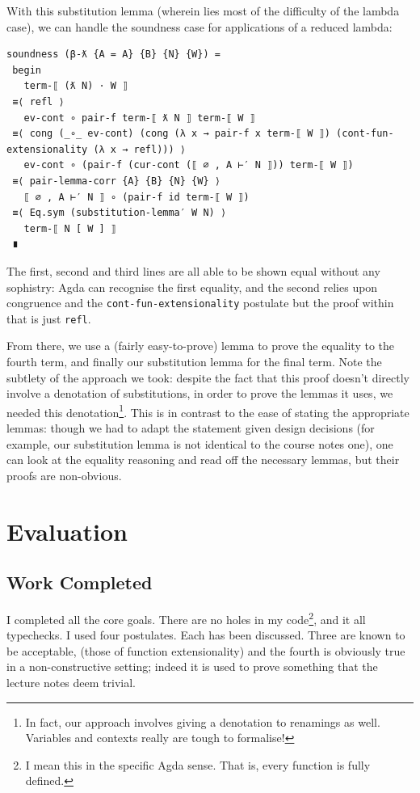 \documentclass[12pt,a4paper,twoside,openright]{report}
\begin{document}
With this substitution lemma (wherein lies most of the difficulty of the lambda case), we can handle the soundness case for applications of a reduced lambda:
\begin{verbatim}
soundness (β-ƛ {A = A} {B} {N} {W}) =
 begin
   term-⟦ (ƛ N) · W ⟧
 ≡⟨ refl ⟩
   ev-cont ∘ pair-f term-⟦ ƛ N ⟧ term-⟦ W ⟧
 ≡⟨ cong (_∘_ ev-cont) (cong (λ x → pair-f x term-⟦ W ⟧) (cont-fun-extensionality (λ x → refl))) ⟩
   ev-cont ∘ (pair-f (cur-cont (⟦ ∅ , A ⊢′ N ⟧)) term-⟦ W ⟧)
 ≡⟨ pair-lemma-corr {A} {B} {N} {W} ⟩
   ⟦ ∅ , A ⊢′ N ⟧ ∘ (pair-f id term-⟦ W ⟧)
 ≡⟨ Eq.sym (substitution-lemma′ W N) ⟩
   term-⟦ N [ W ] ⟧
 ∎
\end{verbatim}
The first, second and third lines are all able to be shown equal without any sophistry: Agda can recognise the first equality, and the second relies upon congruence and the \texttt{cont-fun-extensionality} postulate but the proof within that is just \texttt{refl}. 

From there, we use a (fairly easy-to-prove) lemma to prove the equality to the fourth term, and finally our substitution lemma for the final term. Note the subtlety of the approach we took: despite the fact that this proof doesn't directly involve a denotation of substitutions, in order to prove the lemmas it uses, we needed this denotation\footnote{In fact, our approach involves giving a denotation to renamings as well. Variables and contexts really are tough to formalise!}. This is in contrast to the ease of stating the appropriate lemmas: though we had to adapt the statement given design decisions (for example, our substitution lemma is not identical to the course notes one), one can look at the equality reasoning and read off the necessary lemmas, but their proofs are non-obvious. 
\chapter{Evaluation}
\section{Work Completed}
I completed all the core goals. There are no holes in my code\footnote{I mean this in the specific Agda sense. That is, every function is fully defined.}, and it all typechecks. I used four postulates. Each has been discussed. Three are known to be acceptable, (those of function extensionality) and the fourth is obviously true in a non-constructive setting; indeed it is used to prove something that the lecture notes deem trivial. 
\end{document}
